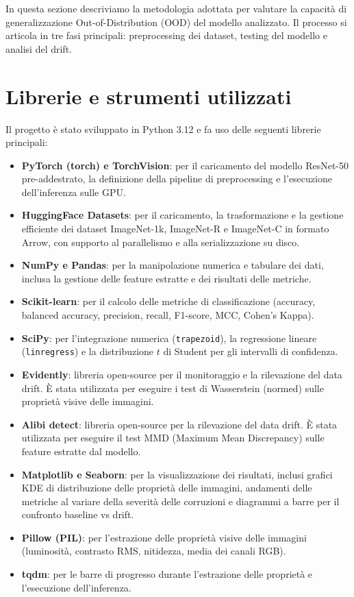 
In questa sezione descriviamo la metodologia adottata per valutare la capacità di generalizzazione Out-of-Distribution (OOD) del modello analizzato. Il processo si articola in tre fasi principali: preprocessing dei dataset, testing del modello e analisi del drift.

\section{Librerie e strumenti utilizzati}
Il progetto è stato sviluppato in Python 3.12 e fa uso delle seguenti librerie principali:

\begin{itemize}
	\item \textbf{PyTorch (torch) e TorchVision}: per il caricamento del modello ResNet-50 pre-addestrato, la definizione della pipeline di preprocessing e l'esecuzione dell'inferenza sulle GPU.
	\item \textbf{HuggingFace Datasets}: per il caricamento, la trasformazione e la gestione efficiente dei dataset ImageNet-1k, ImageNet-R e ImageNet-C in formato Arrow, con supporto al parallelismo e alla serializzazione su disco.
	\item \textbf{NumPy e Pandas}: per la manipolazione numerica e tabulare dei dati, inclusa la gestione delle feature estratte e dei risultati delle metriche.
	\item \textbf{Scikit-learn}: per il calcolo delle metriche di classificazione (accuracy, balanced accuracy, precision, recall, F1-score, MCC, Cohen's Kappa).
	\item \textbf{SciPy}: per l'integrazione numerica (\texttt{trapezoid}), la regressione lineare (\texttt{linregress}) e la distribuzione $t$ di Student per gli intervalli di confidenza.
	\item \textbf{Evidently}: libreria open-source per il monitoraggio e la rilevazione del data drift. È stata utilizzata per eseguire i test di Wasserstein (normed) sulle proprietà visive delle immagini.
	\item \textbf{Alibi detect}: libreria open-source per la rilevazione del data drift. È stata utilizzata per eseguire il test MMD (Maximum Mean Discrepancy) sulle feature estratte dal modello.
	\item \textbf{Matplotlib e Seaborn}: per la visualizzazione dei risultati, inclusi grafici KDE di distribuzione delle proprietà delle immagini, andamenti delle metriche al variare della severità delle corruzioni e diagrammi a barre per il confronto baseline vs drift.
	\item \textbf{Pillow (PIL)}: per l'estrazione delle proprietà visive delle immagini (luminosità, contrasto RMS, nitidezza, media dei canali RGB).
	\item \textbf{tqdm}: per le barre di progresso durante l'estrazione delle proprietà e l'esecuzione dell'inferenza.
\end{itemize}

